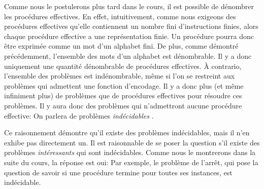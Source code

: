 Comme nous le postulerons plus tard dans le cours, il est possible de dénombrer les procédures effectives.
En effet, intuitivement, comme nous exigeons des procédures effectives qu'elle contiennent un nombre fini d'instructions finies, alors chaque procédure effective a une représentation finie.
Un procédure pourra donc être exprimée comme un mot d'un alphabet fini.
De  plus, comme démontré précédemment, l'ensemble des mots d'un alphabet est dénombrable.
Il y a donc uniquement une quantité dénombrable de procédures effectives.
À contrario, l'ensemble des problèmes est indénombrable, même si l'on se restreint aux problèmes qui admettent une fonction d'encodage.
Il y a donc plus (et même infiniment plus) de problèmes que de procédures effectives pour résoudre ces problèmes.
Il y aura donc des problèmes qui n'admettront aucune procédure effective: On parlera de problèmes \og \textit{indécidables} \fg{}.

Ce raisonnement démontre qu'il existe des problèmes indécidables, mais il n'en exhibe pas directement un.
Il est raisonnable de se poser la question s'il existe des problèmes \textit{intéressants} qui sont indécidables.
Comme nous le montrerons dans la suite du cours, la réponse est oui:
Par exemple, le problème de l'arrêt, qui pose la question de savoir si une procédure termine pour toutes ses instances, est indécidable.


 
